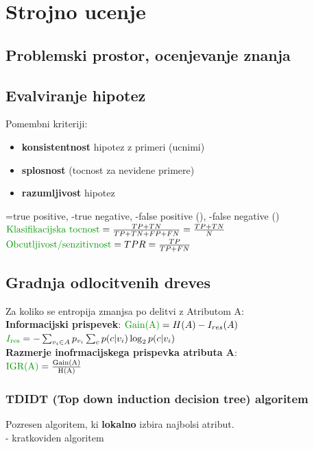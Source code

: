 \section{Strojno ucenje}


\subsection{Problemski prostor, ocenjevanje znanja}

\subsection{Evalviranje hipotez}
Pomembni kriteriji:
\begin{itemize}[leftmargin=*,labelindent=0pt,labelwidth=0pt,itemsep=0pt,parsep=0pt,topsep=0pt]
    \item \textbf{konsistentnost} hipotez z primeri (ucnimi)
    \item \textbf{splosnost} (tocnost za nevidene primere)
    \item \textbf{razumljivost} hipotez
\end{itemize}
=true positive, -true negative, -false positive (), -false negative () \\
$\text{\green{Klasifikacijska tocnost}}=\frac{TP+TN}{TP+TN+FP+FN}=\frac{TP+TN}{N}$\\
$\text{\green{Obcutljivost/senzitivnost}}=TPR=\frac{TP}{TP+FN}$

\subsection{Gradnja odlocitvenih dreves}
Za koliko se entropija zmanjsa po delitvi z Atributom A:\\
\textbf{Informacijski prispevek}: $\text{\green{Gain(A)}}=H(A)-I_{res}(A)$\\
$\green{I_{\text{res}}}=-\sum_{v_i\in A}p_{v_i}\sum_c p(c|v_i)\log_2p(c|v_i)$\\
\textbf{Razmerje inofrmacijskega prispevka atributa A}:\\ 
$\text{\green{IGR(A)}}=\frac{\text{Gain(A)}}{\text{H(A)}}$


\subsubsection{TDIDT (Top down induction decision tree) algoritem}
Pozresen algoritem, ki \textbf{lokalno} izbira najbolsi atribut.\\
- kratkoviden algoritem

